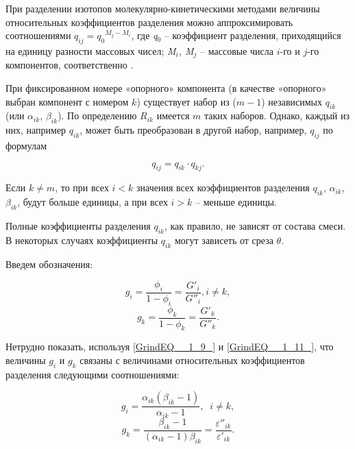 При разделении изотопов молекулярно-кинетическими методами величины относительных коэффициентов разделения можно аппроксимировать соотношениями $q_{ij} =q_{0} {}^{M_{j} -M_{i} }$, где \textit{q}${}_{0}$ – коэффициент разделения, приходящийся на единицу разности массовых чисел; \textit{M${}_{i}$, M${}_{j}$} – массовые числа $i$-го и $j$-го компонентов, соответственно \cite{sulaberidzeTeoriyaKaskadovDlya2011}.

При фиксированном номере «опорного» компонента (в качестве «опорного» выбран компонент с номером $k$) существует набор из ($m-1$) независимых $q_{ik} $ (или $\alpha _{ik} $, $\beta _{ik}$). По определению $R_{ik} $ имеется $m$ таких наборов. Однако, каждый из них, например $q_{ik} $, может быть преобразован в другой набор, например, $q_{ij}$ по формулам

\begin{equation} \label{GrindEQ__1_12_} 
  q_{ij} =q_{ik} \cdot q_{kj} .            
\end{equation} 

Если $k\ne m$, то при всех $i<k$ значения всех коэффициентов разделения $q_{ik} $, $\alpha _{ik} $, $\beta _{ik} $, будут больше единицы, а при всех $i>k$ -- меньше единицы.

Полные коэффициенты разделения $q_{ik} $, как правило, не зависят от состава смеси. В некоторых случаях коэффициенты $q_{ik} $ могут зависеть от среза $\theta $.

Введем обозначения:

\begin{equation} \label{GrindEQ__1_13_} 
  g_{i} =\frac{\phi _{i} }{1-\phi _{i} } =\frac{G'_{i} }{G''_{i} } , i\ne k, 
  \end{equation} 
  \begin{equation} \label{GrindEQ__1_14_} 
  g_{k} =\frac{\phi _{k} }{1-\phi _{k} } =\frac{G'_{k} }{G''_{k} } .           
  \end{equation} 

Нетрудно показать, используя  \ref{GrindEQ__1_9_} и  \ref{GrindEQ__1_11_}, что величины $g_{i}$ и $g_{k}$  связаны с величинами относительных коэффициентов разделения следующими соотношениями:

\begin{equation} \label{GrindEQ__1_15_} 
  g_{i} =\frac{\alpha _{ik} (\beta _{ik} -1)}{\alpha _{ik} -1} ,\; \; i\ne k,           
  \end{equation} 
  \begin{equation} \label{GrindEQ__1_16_} 
  g_{k} =\frac{\beta _{ik} -1}{(\alpha _{ik} -1)\beta _{ik} } =\frac{\varepsilon ''_{ik} }{\varepsilon '_{ik} } . 
\end{equation} 

